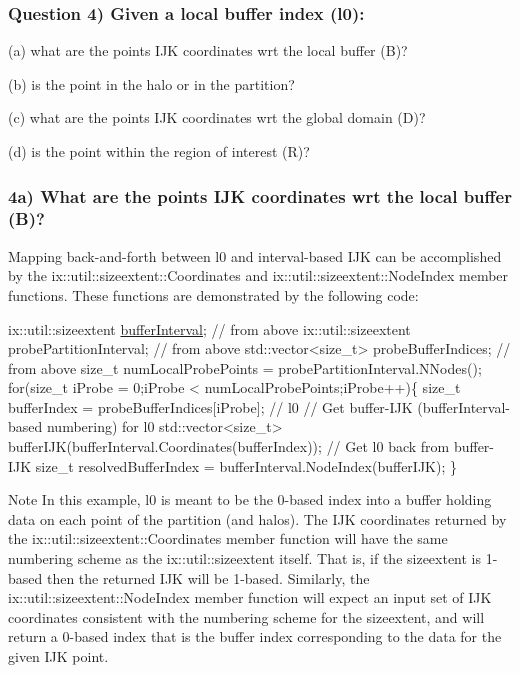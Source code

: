 \subsubsection*{Question 4) Given a local buffer index (l0)\+:}


\begin{DoxyItemize}
\item (a) what are the point\textquotesingle{}s I\+JK coordinates wrt the local buffer (B)?
\item (b) is the point in the halo or in the partition?
\item (c) what are the point\textquotesingle{}s I\+JK coordinates wrt the global domain (D)?
\item (d) is the point within the region of interest (R)?
\end{DoxyItemize}

\subsubsection*{4a) What are the point\textquotesingle{}s I\+JK coordinates wrt the local buffer (B)?}

Mapping back-\/and-\/forth between l0 and interval-\/based I\+JK can be accomplished by the ix\+::util\+::sizeextent\+::\+Coordinates and ix\+::util\+::sizeextent\+::\+Node\+Index member functions. These functions are demonstrated by the following code\+:


\begin{DoxyCode}
ix::util::sizeextent \hyperlink{SATKernels_8H_a4caa6f5ca62531b8c31e22919f206d68}{bufferInterval};          \textcolor{comment}{// from above}
ix::util::sizeextent probePartitionInterval;  \textcolor{comment}{// from above}
std::vector<size\_t> probeBufferIndices;       \textcolor{comment}{// from above}
\textcolor{keywordtype}{size\_t} numLocalProbePoints = probePartitionInterval.NNodes();
\textcolor{keywordflow}{for}(\textcolor{keywordtype}{size\_t} iProbe = 0;iProbe < numLocalProbePoints;iProbe++)\{
   \textcolor{keywordtype}{size\_t} bufferIndex = probeBufferIndices[iProbe]; \textcolor{comment}{// l0}
   \textcolor{comment}{// Get buffer-IJK (bufferInterval-based numbering) for l0}
   std::vector<size\_t> bufferIJK(bufferInterval.Coordinates(bufferIndex));
   \textcolor{comment}{// Get l0 back from buffer-IJK}
   \textcolor{keywordtype}{size\_t} resolvedBufferIndex = bufferInterval.NodeIndex(bufferIJK);
\}
\end{DoxyCode}


\begin{DoxyNote}{Note}
In this example, l0 is meant to be the 0-\/based index into a buffer holding data on each point of the partition (and halos). The I\+JK coordinates returned by the ix\+::util\+::sizeextent\+::\+Coordinates member function will have the same numbering scheme as the ix\+::util\+::sizeextent itself. That is, if the sizeextent is 1-\/based then the returned I\+JK will be 1-\/based. Similarly, the ix\+::util\+::sizeextent\+::\+Node\+Index member function will expect an input set of I\+JK coordinates consistent with the numbering scheme for the sizeextent, and will return a 0-\/based index that is the buffer index corresponding to the data for the given I\+JK point.
\end{DoxyNote}
